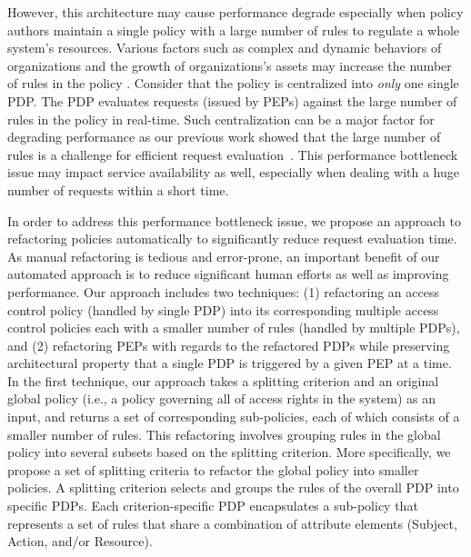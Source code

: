  

However, this architecture may cause performance degrade
especially when policy authors maintain a single policy with a large number of rules to regulate a whole system's resources.
Various factors such as complex and dynamic behaviors of organizations and the growth of organizations's assets may increase the 
number of rules in the policy \cite{policymanagement}. 
Consider that the policy is centralized into \emph{only} one single PDP.
The PDP evaluates requests (issued by PEPs) against
the large number of rules in the policy in real-time.
Such centralization can be a major factor for degrading performance as our previous work showed that the large number of rules is a challenge for efficient request evaluation~\cite{Xengine}.
This performance bottleneck issue may impact service 
availability as well, especially when dealing with a huge number of requests within a short time.


In order to address this performance bottleneck issue,
we propose an approach to refactoring policies automatically to significantly reduce
request evaluation time.
As manual refactoring is tedious and
error-prone, an important benefit of our automated approach is to reduce significant human efforts as well as
improving performance.
Our approach includes two techniques: (1) refactoring an access control policy (handled by single PDP) into its corresponding multiple access
control policies each with a smaller number of rules (handled by multiple PDPs),
and (2) refactoring PEPs with regards to the refactored PDPs while preserving architectural property that a single PDP is triggered by a given PEP at a time.\\

In the first technique, our approach takes a splitting criterion and an original global policy (i.e., a policy governing all of access rights in the system) as an input, and returns a set of 
corresponding sub-policies, each of which consists of a smaller number of rules.
This refactoring involves grouping rules in the global policy  into several subsets based on the splitting criterion.
More specifically, we propose a set of splitting criteria to
refactor the global policy into smaller policies.
A splitting criterion selects and groups the rules of the overall PDP into specific PDPs.
Each criterion-specific PDP encapsulates a sub-policy that represents a set of rules that share a combination
of attribute elements (Subject, Action, and/or Resource).

